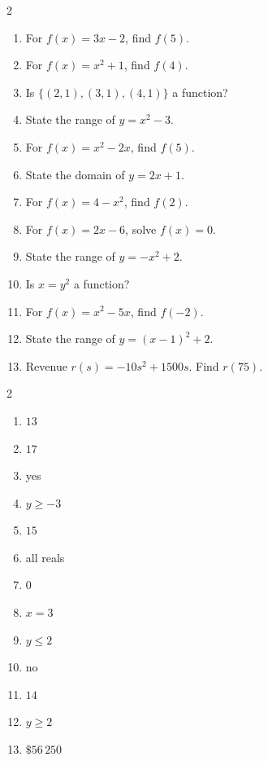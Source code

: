 \documentclass[11pt]{article}
\begin{document}
\begin{recapbox}
\begin{multicols}{2}
\small
\begin{enumerate}[leftmargin=*,itemsep=3pt]
  \item For $f(x)=3x-2$, find $f(5)$.
  \item For $f(x)=x^2+1$, find $f(4)$.
  \item Is $\{(2,1),(3,1),(4,1)\}$ a function?
  \item State the range of $y=x^2-3$.
  \item For $f(x)=x^2-2x$, find $f(5)$.
  \item State the domain of $y=2x+1$.
  \item For $f(x)=4-x^2$, find $f(2)$.
  \item For $f(x)=2x-6$, solve $f(x)=0$.
  \item State the range of $y=-x^2+2$.
  \item Is $x=y^2$ a function?
  \item For $f(x)=x^2-5x$, find $f(-2)$.
  \item State the range of $y=(x-1)^2+2$.
  \item Revenue $r(s)=-10s^2+1500s$. Find $r(75)$.
\end{enumerate}
\end{multicols}
\end{recapbox}

\begin{keybox}
\begin{multicols}{2}
\small
\begin{enumerate}[leftmargin=*,itemsep=3pt]
  \item $13$
  \item $17$
  \item yes
  \item $y\ge-3$
  \item $15$
  \item all reals
  \item $0$
  \item $x=3$
  \item $y\le2$
  \item no
  \item $14$
  \item $y\ge2$
  \item $\$56\,250$
\end{enumerate}
\end{multicols}
\end{keybox}
\end{document}
